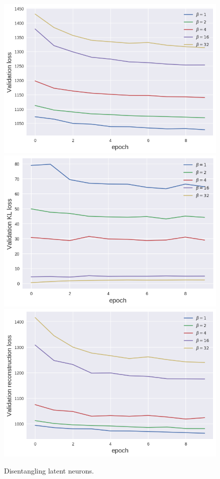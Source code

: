\begin{figure}[h!]
\centering
\captionsetup{justification=centering}
    \includegraphics[scale=0.5]{figures/results/indiscriminate_decoupling/val_loss.png}
    \includegraphics[scale=0.5]{figures/results/indiscriminate_decoupling/val_kl_loss.png}
    \includegraphics[scale=0.5]{figures/results/indiscriminate_decoupling/val_reconstruction_loss.png}
\caption{Disentangling latent neurons.}
\label{fig:indiscriminate_decoupling_graphs}
\end{figure}



